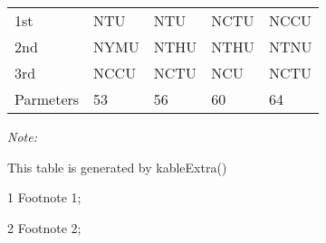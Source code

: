 \begin{table}
\begin{threeparttable}
\begin{tabular}[t]{lllll}
\hspace{1em}1st & NTU & NTU & NCTU & NCCU\\
\hspace{1em}2nd & NYMU & NTHU & NTHU & NTNU\\
\hspace{1em}3rd & NCCU & NCTU & NCU & NCTU\\
Parmeters & 53 & 56 & 60 & 64\\
\bottomrule
\end{tabular}
\begin{tablenotes}
\item \textit{Note: } 
\item This table is generated by kableExtra()
\item[1] Footnote 1; 
\item[2] Footnote 2; 
\end{tablenotes}
\end{threeparttable}
\end{table}
